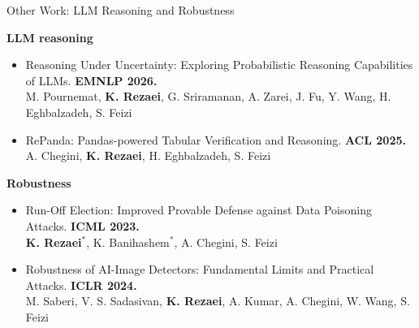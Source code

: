 \documentclass[aspectratio=169]{beamer}
\begin{document}
\begin{frame}{Other Work: LLM Reasoning and Robustness}
    \vspace{0.2em}
    {\scriptsize
        \textbf{LLM reasoning}
        \begin{itemize}\setlength\itemsep{4pt}
            \item Reasoning Under Uncertainty: Exploring Probabilistic Reasoning Capabilities of LLMs. \textcolor{xattn}{\textbf{EMNLP 2026.}}\\
                  {\color{gray!45!black}M. Pournemat, \textbf{K. Rezaei}, G. Sriramanan, A. Zarei, J. Fu, Y. Wang, H. Eghbalzadeh, S. Feizi}
            \item RePanda: Pandas-powered Tabular Verification and Reasoning. \textcolor{xattn}{\textbf{ACL 2025.}}\\
                  {\color{gray!45!black}A. Chegini, \textbf{K. Rezaei}, H. Eghbalzadeh, S. Feizi}
        \end{itemize}

        \vspace{0.6em}
        \textbf{Robustness}
        \begin{itemize}\setlength\itemsep{4pt}
            \item Run-Off Election: Improved Provable Defense against Data Poisoning Attacks. \textcolor{xattn}{\textbf{ICML 2023.}}\\
                  {\color{gray!45!black}\textbf{K. Rezaei}$^*$, K. Banihashem$^*$, A. Chegini, S. Feizi}
            \item Robustness of AI-Image Detectors: Fundamental Limits and Practical Attacks. \textcolor{xattn}{\textbf{ICLR 2024.}}\\
                  {\color{gray!45!black}M. Saberi, V. S. Sadasivan, \textbf{K. Rezaei}, A. Kumar, A. Chegini, W. Wang, S. Feizi}
        \end{itemize}}
\end{frame}
\end{document}
